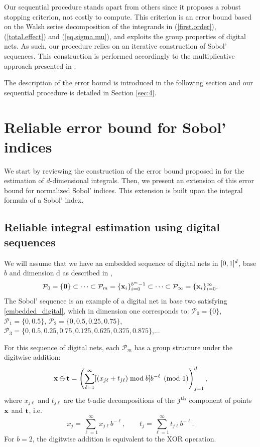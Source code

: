 Our sequential procedure stands apart from others since it proposes a robust stopping criterion, not costly to compute. This criterion is an error bound based on the Walsh series decomposition of the integrands in (\ref{first.order}), (\ref{total.effect}) and (\ref{eq.sigma.mu}), and exploits the group properties of digital nets. As such, our procedure relies on an iterative construction of Sobol' sequences. This construction is performed accordingly to the multiplicative approach presented in \cite{GJAHMP}.

The description of the error bound is introduced in the following section and our sequential procedure is detailed in Section \ref{sec:4}.


\section{Reliable error bound for Sobol' indices}
\label{sec:3} 
We start by reviewing the construction of the error bound proposed in \cite{HicJim} for the estimation of $d$-dimensional integrals. Then, we present an extension of this error bound for normalized Sobol' indices. This extension is built upon the integral formula of a Sobol' index.

\subsection{Reliable integral estimation using digital sequences}
\label{sec:3.1}

We will assume that we have an embedded sequence of digital nets in $[0,1]^d$, base $b$ and dimension d as described in \cite[Sec. 2-3]{HicJim},
\begin{equation}\label{embedded_digital}
\mathcal{P}_0=\{\boldsymbol{\mathbf{0}}\}\subset\dots\subset\mathcal{P}_m=\{\boldsymbol{\mathbf{x}}_i\}_{i=0}^{b^m-1}\subset\dots\subset\mathcal{P}_\infty=\{\boldsymbol{\mathbf{x}}_i\}_{i=0}^{\infty}.
\end{equation}
The Sobol' sequence is an example of a digital net in base two satisfying \eqref{embedded_digital}, which in dimension one corresponds to: $\mathcal{P}_0=\{0\}$, $\mathcal{P}_1=\{0,0.5\}$, $\mathcal{P}_2=\{0,0.5,0.25,0.75\}$, $\mathcal{P}_3=\{0,0.5,0.25,0.75,0.125,0.625,0.375,0.875\}$,...

For this sequence of digital nets, each $\mathcal{P}_m$ has a group structure under the digitwise addition:
\[
\boldsymbol{\mathbf{x}} \oplus \boldsymbol{\mathbf{t}} = \left(\sum_{\ell=1}^{\infty} [(x_{j\ell} + t_{j\ell}) \bmod b] b^{-\ell} \pmod{1} \right)_{j=1}^d,
\]
where $x_{j\ell}$ and $t_{j\ell}$ are the $b$-adic decompositions of the $j^{\rm th}$ component of points $\boldsymbol{\mathbf{x}}$ and $\boldsymbol{\mathbf{t}}$, i.e.
\[
x_{j} = \sum_{\ell=1}^{\infty} x_{j\ell}b^{-\ell},\qquad t_{j} = \sum_{\ell=1}^{\infty} t_{j\ell}b^{-\ell}.
\]
For $b=2$, the digitwise addition is equivalent to the XOR operation.

